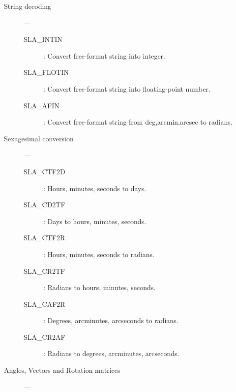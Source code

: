 \begin{description}

\item [String decoding] ---

\begin{description}
\item [SLA\_INTIN] : Convert free-format string into integer.
\item [SLA\_FLOTIN] : Convert free-format string into floating-point number.
\item [SLA\_AFIN] : Convert free-format string from deg,arcmin,arcsec to radians.
\end{description}

\item [Sexagesimal conversion] ---

\begin{description}
\item [SLA\_CTF2D] : Hours, minutes, seconds to days.
\item [SLA\_CD2TF] : Days to hours, minutes, seconds.
\item [SLA\_CTF2R] : Hours, minutes, seconds to radians.
\item [SLA\_CR2TF] : Radians to hours, minutes, seconds.
\item [SLA\_CAF2R] : Degrees, arcminutes, arcseconds to radians.
\item [SLA\_CR2AF] : Radians to degrees, arcminutes, arcseconds.
\end{description}

\item [Angles, Vectors and Rotation matrices] ---


\end{description}

